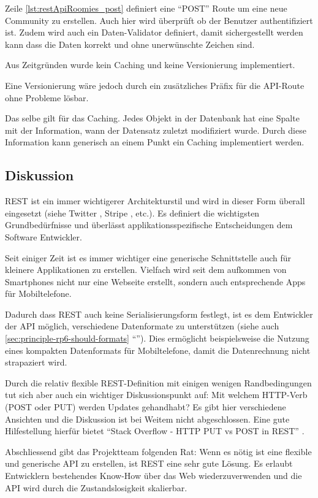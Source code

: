 Zeile \autoref{lst:restApiRoomies_post} definiert eine ``POST'' Route um eine neue Community zu erstellen. Auch hier wird überprüft ob der Benutzer authentifiziert ist. Zudem wird auch ein Daten-Validator definiert, damit sichergestellt werden kann dass die Daten korrekt und ohne unerwünschte Zeichen sind.

Aus Zeitgründen wurde kein Caching und keine Versionierung implementiert.

Eine Versionierung wäre jedoch durch ein zusätzliches Präfix für die API-Route ohne Probleme lösbar.

Das selbe gilt für das Caching. Jedes Objekt in der Datenbank hat eine Spalte mit der Information, wann der Datensatz zuletzt modifiziert wurde. Durch diese Information kann generisch an einem Punkt ein Caching implementiert werden.

\subsection*{Diskussion}

REST ist ein immer wichtigerer Architekturstil und wird in dieser Form überall eingesetzt (siehe Twitter \cite{TwitterAPI}, Stripe \cite{StripeAPI}, etc.). Es definiert die wichtigsten Grundbedürfnisse und überlässt applikationsspezifische Entscheidungen dem Software Entwickler.

Seit einiger Zeit ist es immer wichtiger eine generische Schnittstelle auch für kleinere Applikationen zu erstellen. Vielfach wird seit dem aufkommen von Smartphones nicht nur eine Webseite erstellt, sondern auch entsprechende Apps für Mobiltelefone.

Dadurch dass REST auch keine Serialisierungsform festlegt, ist es dem Entwickler der API möglich, verschiedene Datenformate zu unterstützen (siehe auch \ref{sec:principle-rp6-should-formats} ``''). Dies ermöglicht beispielsweise die Nutzung eines kompakten Datenformats für Mobiltelefone, damit die Datenrechnung nicht strapaziert wird.

Durch die relativ flexible REST-Definition mit einigen wenigen Randbedingungen tut sich aber auch ein wichtiger Diskussionspunkt auf: Mit welchem HTTP-Verb (POST oder PUT) werden Updates gehandhabt? Es gibt hier verschiedene Ansichten und die Diskussion ist bei Weitem nicht abgeschlossen. Eine gute Hilfestellung hierfür bietet ``Stack Overflow - HTTP PUT vs POST in REST'' \cite{StackoverflowPUTvsPOST}.

Abschliessend gibt das Projektteam folgenden Rat: Wenn es nötig ist eine flexible und generische API zu erstellen, ist REST eine sehr gute Lösung. Es erlaubt Entwicklern bestehendes Know-How über das Web wiederzuverwenden und die API wird durch die Zustandslosigkeit skalierbar.